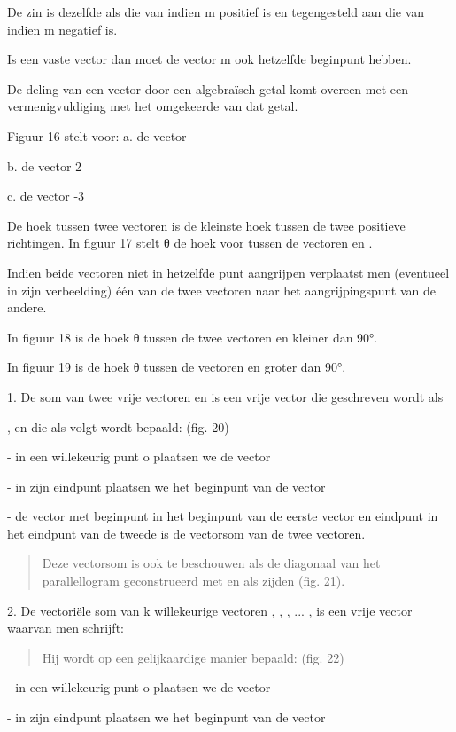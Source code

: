 \documentclass[]{article}
\begin{document}
De zin is dezelfde als die van indien m positief is en tegengesteld aan
die van indien m negatief is.

Is een vaste vector dan moet de vector m ook hetzelfde beginpunt hebben.

De deling van een vector door een algebraïsch getal komt overeen met een
vermenigvuldiging met het omgekeerde van dat getal.

Figuur 16 stelt voor: a. de vector

b. de vector 2

c. de vector -3

De hoek tussen twee vectoren is de kleinste hoek tussen de twee
positieve richtingen. In figuur 17 stelt θ de hoek voor tussen de
vectoren en .

Indien beide vectoren niet in hetzelfde punt aangrijpen verplaatst men
(eventueel in zijn verbeelding) één van de twee vectoren naar het
aangrijpingspunt van de andere.

In figuur 18 is de hoek θ tussen de twee vectoren en kleiner dan 90°.

In figuur 19 is de hoek θ tussen de vectoren en groter dan 90°.

1. De som van twee vrije vectoren en is een vrije vector die geschreven
wordt als

, en die als volgt wordt bepaald: (fig. 20)

- in een willekeurig punt o plaatsen we de vector

- in zijn eindpunt plaatsen we het beginpunt van de vector

- de vector met beginpunt in het beginpunt van de eerste vector en
eindpunt in het eindpunt van de tweede is de vectorsom van de twee
vectoren.

\begin{quote}
Deze vectorsom is ook te beschouwen als de diagonaal van het
parallellogram geconstrueerd met en als zijden (fig. 21).
\end{quote}

2. De vectoriële som van k willekeurige vectoren , , , ... , is een
vrije vector waarvan men schrijft:

\begin{quote}
Hij wordt op een gelijkaardige manier bepaald: (fig. 22)
\end{quote}

- in een willekeurig punt o plaatsen we de vector

- in zijn eindpunt plaatsen we het beginpunt van de vector
\end{document}
